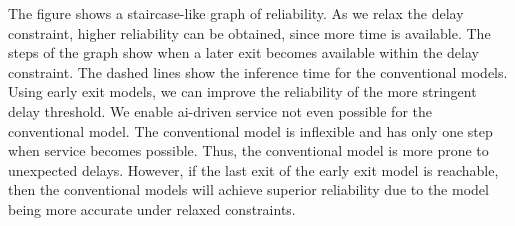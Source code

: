 The figure shows a staircase-like graph of reliability. As we relax the delay constraint, higher reliability can be obtained, since more time is available. The steps of the graph show when a later exit becomes available within the delay constraint. The dashed lines show the inference time for the conventional models. Using early exit models, we can improve the reliability of the more stringent delay threshold. We enable \gls{ai}-driven service not even possible for the conventional model. The conventional model is inflexible and has only one step when service becomes possible. Thus, the conventional model is more prone to unexpected delays. However, if the last exit of the early exit model is reachable, then the conventional models will achieve superior reliability due to the model being more accurate under relaxed constraints. 

